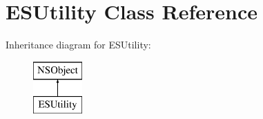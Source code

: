 \hypertarget{interface_e_s_utility}{}\section{E\+S\+Utility Class Reference}
\label{interface_e_s_utility}
Inheritance diagram for E\+S\+Utility\+:\begin{figure}[H]
\begin{center}
\leavevmode
\includegraphics[height=2.000000cm]{interface_e_s_utility}
\end{center}
\end{figure}

